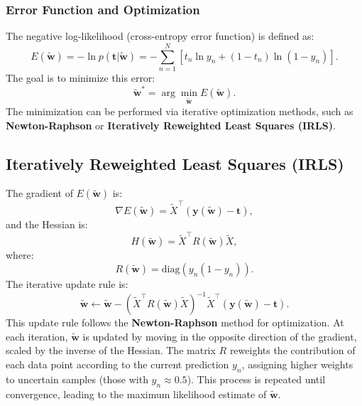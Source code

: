 \documentclass[10pt, letterpaper]{report}
\begin{document}
\subsubsection{Error Function and Optimization}
The negative log-likelihood (cross-entropy error function) is defined as:
\begin{equation}
	E(\tilde{\mathbf w}) = -\ln p(\mathbf t|\tilde{\mathbf w}) = -\sum_{n=1}^N[t_n\ln y_n + (1-t_n)\ln(1-y_n)].
\end{equation}
The goal is to minimize this error:
\begin{equation}
	\tilde{\mathbf w}^* = \arg\min_{\tilde{\mathbf w}} E(\tilde{\mathbf w}).
\end{equation}
The minimization can be performed via iterative optimization methods, such as \textbf{Newton-Raphson} or \textbf{Iteratively Reweighted Least Squares (IRLS)}.

\subsection{Iteratively Reweighted Least Squares (IRLS)}
The gradient of $E(\tilde{\mathbf w})$ is:
\begin{equation}
	\nabla E(\tilde{\mathbf w}) = \tilde{X}^\top (\mathbf y(\tilde{\mathbf w}) - \mathbf t),
\end{equation}
and the Hessian is:
\begin{equation}
	H(\tilde{\mathbf w}) = \tilde{X}^\top R(\tilde{\mathbf w})\tilde{X},
\end{equation}
where:
\begin{equation}
	R(\tilde{\mathbf w}) = \mathrm{diag}(y_n(1-y_n)).
\end{equation}
The iterative update rule is:
\begin{equation}
	\tilde{\mathbf w} \leftarrow 
	\tilde{\mathbf w} - 
	( \tilde{X}^\top R(\tilde{\mathbf w})\tilde{X})^{-1} 
	\tilde{X}^\top(\mathbf y(\tilde{\mathbf w}) - \mathbf t).
\end{equation}
\noindent
This update rule follows the \textbf{Newton-Raphson} method for optimization.  
At each iteration, $\tilde{\mathbf w}$ is updated by moving in the opposite direction of the gradient, scaled by the inverse of the Hessian.  
The matrix $R$ reweights the contribution of each data point according to the current prediction $y_n$, assigning higher weights to uncertain samples (those with $y_n \approx 0.5$).  
This process is repeated until convergence, leading to the maximum likelihood estimate of $\tilde{\mathbf w}$.
\end{document}
